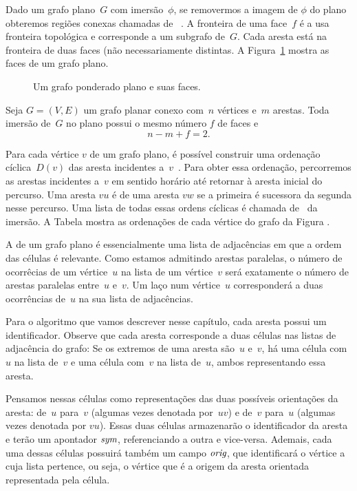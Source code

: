 Dado um grafo plano~$G$ com imersão~$\phi$, se removermos a imagem de $\phi$ do plano obteremos regiões conexas chamadas de ~\cite{planarTheoryAlgorith}.
A fronteira de uma face~$f$ é a usa fronteira topológica e corresponde a um subgrafo de~$G$.
Cada aresta está na fronteira de duas faces (não necessariamente distintas.
A Figura~\ref{fig:MSF-basico-0} mostra as faces de um grafo plano.

\begin{figure}[htb]
\scalebox{1.5}{
\centering

}
\caption{Um grafo ponderado plano e suas faces.}
\label{fig:MSF-basico-0}
\end{figure}

\begin{theorem}
\label{teo:MSFEuler}
Seja $G=(V,E)$ um grafo planar conexo com~$n$ vértices e~$m$ arestas. Toda imersão de~$G$ no plano possui o mesmo número $f$ de faces e
$$
n-m+f = 2.
$$
\end{theorem}

Para cada vértice $v$ de um grafo plano, é possível construir uma ordenação cíclica~$D(v)$ das aresta incidentes a~$v$~\cite{noma2003}.
Para obter essa ordenação, percorremos as arestas incidentes a~$v$ em sentido horário até retornar à aresta inicial do percurso.
Uma aresta $vu$ é  de uma aresta $vw$ se a primeira é sucessora da segunda nesse percurso.
Uma lista de todas essas ordens cíclicas é chamada de~ da imersão.
A Tabela  mostra as ordenações de cada vértice do grafo da Figura .

A  de um grafo plano é essencialmente uma lista de adjacências em que a ordem das células é relevante.
Como estamos admitindo arestas paralelas, o número de ocorrêcias de um vértice~$u$ na lista de um vértice~$v$ será exatamente o número de arestas paralelas entre~$u$ e~$v$.
Um laço num vértice~$u$ corresponderá a duas ocorrências de~$u$ na sua lista de adjacências.

Para o algoritmo que vamos descrever nesse capítulo, cada aresta possui um identificador.
Observe que cada aresta corresponde a duas células nas listas de adjacência do grafo:
Se os extremos de uma aresta são~$u$ e~$v$, há uma célula com~$u$ na lista de~$v$ e uma célula com~$v$ na lista de~$u$, ambos representando essa aresta.

Pensamos nessas células como representações das duas possíveis orientações da aresta: de~$u$ para~$v$ (algumas vezes denotada por~$uv$) e de~$v$ para~$u$ (algumas vezes denotada por $vu$).
Essas duas células armazenarão o identificador da aresta e terão um apontador $\textit{sym}$, referenciando a outra e vice-versa.
Ademais, cada uma dessas células possuirá também um campo $\textit{orig}$, que identificará o vértice a cuja lista pertence, ou seja, o vértice que é a origem da aresta orientada representada pela célula.

